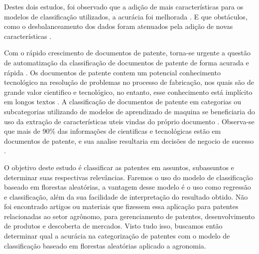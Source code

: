 Destes dois estudos, foi observado que a adição de mais características para os modelos de classificação utilizados, a acurácia foi melhorada \cite{shahid2020}. E que obstáculos, como o desbalanceamento dos dados foram atenuados pela adição de novas características \cite{Anne2017}.

Com o rápido crescimento de documentos de patente, torna-se urgente a questão de automatização da classificação de documentos de patente de forma acurada e rápida \cite{Zhu2020}. Os documentos de patente contem um potencial conhecimento tecnológico na resolução de problemas no processo de fabricação, nos quais são de grande valor cientifico e tecnológico, no entanto, esse conhecimento está implícito em longos textos \cite{Li2018, Wang2016}. A classificação de documentos de patente em categorias ou subcategorias utilizando de modelos de aprendizado  de maquina se beneficiaria do uso da extração de características uteis vindas do próprio documento \cite{Anne2017}. Observa-se que mais de 90\% das informações de cientificas e tecnológicas estão em documentos de patente, e sua analise resultaria em decisões de negocio de sucesso \cite{Li2018}.

O objetivo deste estudo é classificar as patentes em assuntos, subassuntos e determinar suas respectivas relevâncias. Faremos o uso do modelo de classificação baseado em florestas aleatórias, a vantagem desse modelo é o uso como regressão e classificação, além da sua facilidade de interpretação do resultado obtido. Não foi encontrado artigos ou materiais que fizessem essa aplicação para patentes relacionadas ao setor agrônomo, para gerenciamento de patentes, desenvolvimento de produtos e descoberta de mercados. Visto tudo isso, buscamos então determinar qual a acurácia na categorização de patentes com o modelo de classificação baseado em florestas aleatórias aplicado a agronomia.
